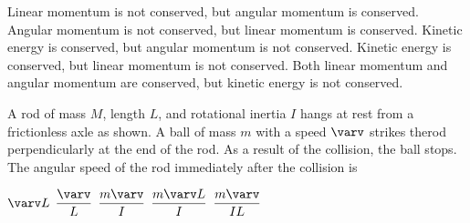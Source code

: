 \documentclass{../../oss-classkick-exam}
\begin{document}
\begin{multicols*}{2}
\begin{questions}
\begin{center}
    \end{center}
    \begin{choices}
      \choice Linear momentum is not conserved, but angular momentum is
      conserved.
      \choice Angular momentum is not conserved, but linear momentum is
      conserved.
      \choice Kinetic energy is conserved, but angular momentum is not
      conserved.
      \choice Kinetic energy is conserved, but linear momentum is not conserved.
      \choice Both linear momentum and angular momentum are conserved, but
      kinetic energy is not conserved.
    \end{choices}
    \vspace{.7in}
    
    \question A rod of mass $M$, length $L$, and rotational inertia $I$ hangs
    at rest from a frictionless axle as shown. A ball of mass $m$ with a speed
    $\varv$ strikes therod perpendicularly at the end of the rod. As a result
    of the collision, the ball stops. The angular speed of the rod immediately
    after the collision is
    \begin{center}
    \end{center}
    \begin{choices}
      \choice $\varv L$
      \choice $\dfrac{\varv}L$
      \choice $\dfrac{m\varv}I$
      \choice $\dfrac{m\varv L}I$
      \choice $\dfrac{m\varv}{IL}$
    \end{choices}
    \columnbreak


\end{questions}
\end{multicols*}
\end{document}
